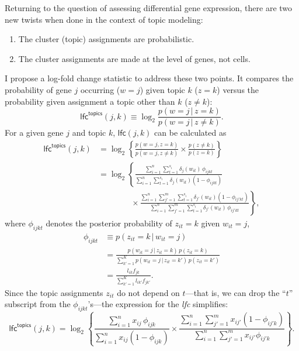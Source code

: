 \documentclass[final]{siamart171218}
\begin{document}
Returning to the question of assessing differential gene expression,
there are two new twists when done in the context of topic modeling:
\begin{enumerate}
  
\item The cluster (topic) assignments are probabilistic.

\item The cluster assignments are made at the level of genes, not
  cells.

\end{enumerate}
I propose a log-fold change statistic to address these two points. It
compares the probability of gene $j$ occurring ($w = j$) given topic
$k$ ($z = k$) versus the probability given assignment a topic other
than $k$ ($z \neq k$):
\begin{equation}
\mathsf{lfc}^{\mathsf{topics}}(j,k) \equiv
\log_2 \frac{p(w = j \,|\, z = k)}
            {p(w = j \,|\, z \neq k)}.
\end{equation}
For a given gene $j$ and topic $k$, $\mathsf{lfc}(j,k)$ can be
calculated as
\begin{align}
\mathsf{lfc}^{\mathsf{topics}}(j,k) &=
\log_2 \left\{ \frac{p(w = j, z = k)}
                    {p(w = j, z \neq k)} \times
               \frac{p(z \neq k)}{p(z = k)} \right\} \nonumber \\
&= \log_2 \left\{ 
\frac{\sum_{i=1}^n \sum_{t=1}^{s_i} \delta_j(w_{it}) \, \phi_{ijkt}}
     {\sum_{i=1}^n \sum_{t=1}^{s_i} \delta_j(w_{it}) (1 - \phi_{ijkt})}
\right. \nonumber \\ 
& \qquad \qquad \times \left. \frac{\sum_{i=1}^n \sum_{j'=1}^m \sum_{t=1}^{s_i} 
             \delta_{j'}(w_{it}) (1-\phi_{ij'kt})}
            {\sum_{i=1}^n \sum_{j'=1}^m \sum_{t=1}^{s_i} \delta_{j'}(w_{it}) 
             \, \phi_{ij'kt}} \right\},
\label{eq:lfc-topic}
\end{align}
where $\phi_{ijkt}$ denotes the posterior probability of $z_{it} = k$
given $w_{it} = j$,
\begin{align}
\phi_{ijkt} &\equiv p(z_{it} = k \,|\, w_{it} = j) \nonumber \\
&= \frac{p(w_{it} = j \,|\, z_{it} = k) \, p(z_{it} = k)}
        {\sum_{k'=1}^K p(w_{it} = j \,|\, z_{it} = k') \, p(z_{it} = k')} 
   \nonumber \\
&= \frac{l_{ik} f_{jk}}
        {\sum_{k'=1}^K l_{ik'} f_{jk'}}.
\end{align}
Since the topic assignments $z_{it}$ do not depend on $t$---that is,
we can drop the ``$t$'' subscript from the $\phi_{ijkt}$'s---the expression
for the {\em lfc} simplifies:
\begin{equation}
\mathsf{lfc}^{\mathsf{topics}}(j,k) = \log_2 \left\{ 
\frac{\sum_{i=1}^n x_{ij} \, \phi_{ijk}}
     {\sum_{i=1}^n x_{ij} (1 - \phi_{ijk})}
     \times \frac{\sum_{i=1}^n \sum_{j'=1}^m x_{ij'} (1-\phi_{ij'k})}
                 {\sum_{i=1}^n \sum_{j'=1}^m x_{ij'} \phi_{ij'k}} \right\}.
\end{equation}
\end{document}
